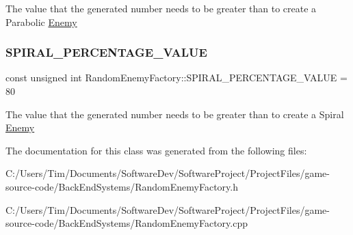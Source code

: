 The value that the generated number needs to be greater than to create a Parabolic \hyperlink{class_enemy}{Enemy} \mbox{\label{class_random_enemy_factory_ac912e49add9d56e8b12d3881ce1cc656}} 
\subsubsection{\texorpdfstring{S\+P\+I\+R\+A\+L\+\_\+\+P\+E\+R\+C\+E\+N\+T\+A\+G\+E\+\_\+\+V\+A\+L\+UE}{SPIRAL\_PERCENTAGE\_VALUE}}
{\footnotesize\ttfamily const unsigned int Random\+Enemy\+Factory\+::\+S\+P\+I\+R\+A\+L\+\_\+\+P\+E\+R\+C\+E\+N\+T\+A\+G\+E\+\_\+\+V\+A\+L\+UE = 80\hspace{0.3cm}{\ttfamily [private]}}

The value that the generated number needs to be greater than to create a Spiral \hyperlink{class_enemy}{Enemy} 

The documentation for this class was generated from the following files\+:\begin{DoxyCompactItemize}
\item 
C\+:/\+Users/\+Tim/\+Documents/\+Software\+Dev/\+Software\+Project/\+Project\+Files/game-\/source-\/code/\+Back\+End\+Systems/Random\+Enemy\+Factory.\+h\item 
C\+:/\+Users/\+Tim/\+Documents/\+Software\+Dev/\+Software\+Project/\+Project\+Files/game-\/source-\/code/\+Back\+End\+Systems/Random\+Enemy\+Factory.\+cpp\end{DoxyCompactItemize}
